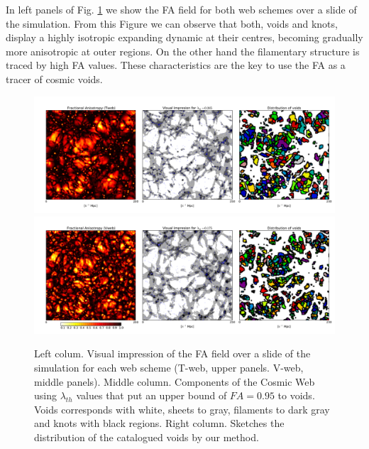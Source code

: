 \documentclass[a4,useAMS,usenatbib,usegraphicx]{mn2e}
\begin{document}
In left panels of Fig. \ref{fig:FA_field} we show the FA field for both 
web schemes over a slide of the simulation. 
From this Figure we can observe that both, voids and knots, display a highly 
isotropic expanding dynamic at their centres, becoming gradually more
anisotropic at outer regions. 
On the other hand the filamentary structure is traced by high FA
values. These characteristics are the key to use the FA as a tracer of
cosmic voids. 

\begin{figure}
  \includegraphics[trim = 16mm 8mm 5mm 12mm, clip, keepaspectratio=true,
  width=0.73\textheight]{cosmicweb_FA_Tweb.pdf}
  \includegraphics[trim = 16mm 8mm 5mm 12mm, clip, keepaspectratio=true,
  width=0.73\textheight]{cosmicweb_FA_Vweb.pdf}
  \caption{Left colum. Visual impression of the 
  FA field over a slide of the simulation for each web scheme (T-web, upper 
  panels. V-web, middle panels). 
  Middle column. Components of the Cosmic Web using $\lambda_{th}$
  values that put an upper bound of $FA=0.95$ to voids. Voids
  corresponds with white, sheets to gray, filaments to dark gray and
  knots with black regions. 
  Right column. Sketches the distribution of the catalogued voids by
  our method.}
  \label{fig:FA_field}
\end{figure}
\end{document}

